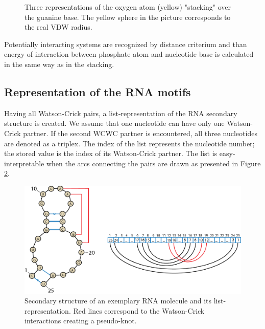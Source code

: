 \documentclass[12pt]{article}
\begin{document}
\begin{figure}[h!]
\begin{center}
{\label{stackingPiexample3}}
\caption{Three representations of the oxygen atom (yellow) "stacking" over the guanine base. The yellow sphere in the \label{stackingPiexample1} picture corresponds to the real VDW radius.}
\label{stackingPiExamples}
\end{center}
\end{figure}
Potentially interacting systems are recognized by distance criterium and than energy of interaction between phosphate atom and nucleotide base is calculated in the same way as in the stacking. 

\subsection{Representation of the RNA motifs}
Having all Watson-Crick pairs, a list-representation of the RNA secondary structure is created. We assume that one nucleotide can have only one Watson-Crick partner. If the second WCWC partner is encountered, all three nucleotides are denoted as a triplex. The index of the list represents the nucleotide number; the stored value is the index of its Watson-Crick partner. The list is easy-interpretable when the arcs connecting the pairs are drawn as  presented in Figure \ref{SecondaryStructureList}. 

\begin{figure}[h!]
\centering
\includegraphics[width = \textwidth]{./pictures/PseudoKnotArchs.png}
\caption{Secondary structure of an exemplary RNA molecule and its list-representation. Red lines correspond to the Watson-Crick interactions creating a pseudo-knot.}
\label{SecondaryStructureList}
\end{figure}
\end{document}
